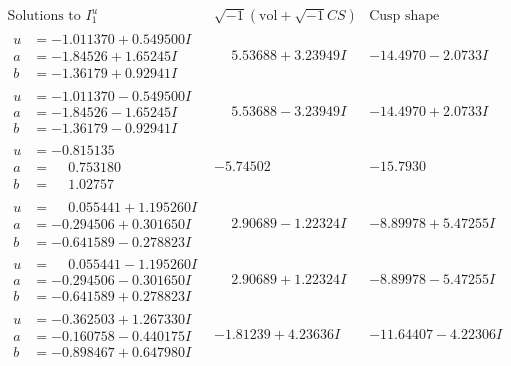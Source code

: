 \documentclass[1p]{elsarticle_modified}
\theoremstyle{definition}
\newcommand{\I}{\sqrt{-1}}
\begin{document}
$$\begin{array}{c|c|c}  
\text{Solutions to }I^u_{1}& \I (\text{vol} + \sqrt{-1}CS) & \text{Cusp shape}\\
 \hline 
\begin{aligned}
u &= -1.011370 + 0.549500 I \\
a &= -1.84526 + 1.65245 I \\
b &= -1.36179 + 0.92941 I\end{aligned}
 & \phantom{-}5.53688 + 3.23949 I & -14.4970 - 2.0733 I \\ \hline\begin{aligned}
u &= -1.011370 - 0.549500 I \\
a &= -1.84526 - 1.65245 I \\
b &= -1.36179 - 0.92941 I\end{aligned}
 & \phantom{-}5.53688 - 3.23949 I & -14.4970 + 2.0733 I \\ \hline\begin{aligned}
u &= -0.815135\phantom{ +0.000000I} \\
a &= \phantom{-}0.753180\phantom{ +0.000000I} \\
b &= \phantom{-}1.02757\phantom{ +0.000000I}\end{aligned}
 & -5.74502\phantom{ +0.000000I} & -15.7930\phantom{ +0.000000I} \\ \hline\begin{aligned}
u &= \phantom{-}0.055441 + 1.195260 I \\
a &= -0.294506 + 0.301650 I \\
b &= -0.641589 - 0.278823 I\end{aligned}
 & \phantom{-}2.90689 - 1.22324 I & -8.89978 + 5.47255 I \\ \hline\begin{aligned}
u &= \phantom{-}0.055441 - 1.195260 I \\
a &= -0.294506 - 0.301650 I \\
b &= -0.641589 + 0.278823 I\end{aligned}
 & \phantom{-}2.90689 + 1.22324 I & -8.89978 - 5.47255 I \\ \hline\begin{aligned}
u &= -0.362503 + 1.267330 I \\
a &= -0.160758 - 0.440175 I \\
b &= -0.898467 + 0.647980 I\end{aligned}
 & -1.81239 + 4.23636 I & -11.64407 - 4.22306 I \\ \hline\begin{aligned}

\end{aligned}
\end{array}$$
\end{document}
